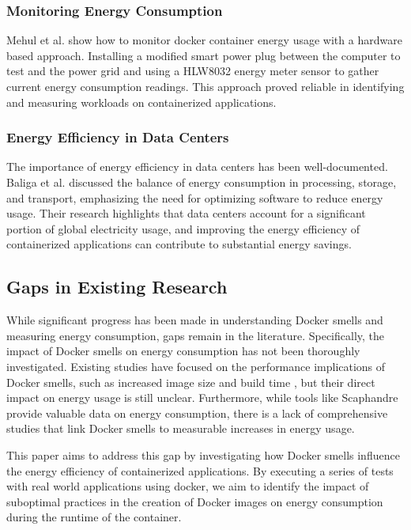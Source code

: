 \documentclass[conference]{IEEEtran}
\begin{document}
\subsubsection{Monitoring Energy Consumption}
Mehul et al. \cite{mehulMonitoringEnergy} show how to monitor docker container energy usage with a hardware based approach. Installing a modified smart power plug between the computer to test and the power grid and using a HLW8032 energy meter sensor to gather current energy consumption readings. This approach proved reliable in identifying and measuring workloads on containerized applications. 

\subsubsection{Energy Efficiency in Data Centers}
The importance of energy efficiency in data centers has been well-documented. Baliga et al. \cite{baliga2011green} discussed the balance of energy consumption in processing, storage, and transport, emphasizing the need for optimizing software to reduce energy usage. Their research highlights that data centers account for a significant portion of global electricity usage, and improving the energy efficiency of containerized applications can contribute to substantial energy savings.

\subsection{Gaps in Existing Research}

While significant progress has been made in understanding Docker smells and measuring energy consumption, gaps remain in the literature. Specifically, the impact of Docker smells on energy consumption has not been thoroughly investigated. Existing studies have focused on the performance implications of Docker smells, such as increased image size and build time \cite{durieuxEmpericalStudy}, but their direct impact on energy usage is still unclear. Furthermore, while tools like Scaphandre provide valuable data on energy consumption, there is a lack of comprehensive studies that link Docker smells to measurable increases in energy usage.

This paper aims to address this gap by investigating how Docker smells influence the energy efficiency of containerized applications. By executing a series of tests with real world applications using docker, we aim to identify the impact of suboptimal practices in the creation of Docker images on energy consumption during the runtime of the container.
\end{document}
